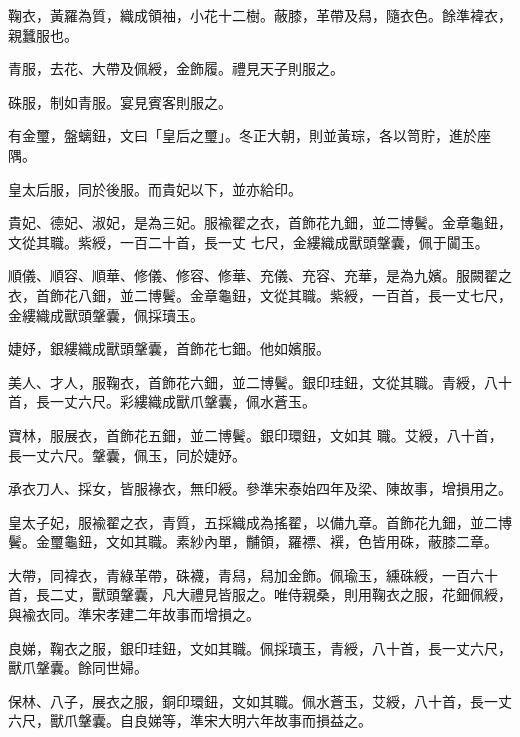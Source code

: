 \begin{pinyinscope}
 鞠衣，黃羅為質，織成領袖，小花十二樹。蔽膝，革帶及舄，隨衣色。餘準褘衣，親蠶服也。



 青服，去花、大帶及佩綬，金飾履。禮見天子則服之。



 硃服，制如青服。宴見賓客則服之。



 有金璽，盤螭鈕，文曰「皇后之璽」。冬正大朝，則並黃琮，各以笥貯，進於座隅。



 皇太后服，同於後服。而貴妃以下，並亦給印。



 貴妃、德妃、淑妃，是為三妃。服褕翟之衣，首飾花九鈿，並二博鬢。金章龜鈕，文從其職。紫綬，一百二十首，長一丈
 七尺，金縷織成獸頭鞶囊，佩于闐玉。



 順儀、順容、順華、修儀、修容、修華、充儀、充容、充華，是為九嬪。服闕翟之衣，首飾花八鈿，並二博鬢。金章龜鈕，文從其職。紫綬，一百首，長一丈七尺，金縷織成獸頭鞶囊，佩採瓄玉。



 婕妤，銀縷織成獸頭鞶囊，首飾花七鈿。他如嬪服。



 美人、才人，服鞠衣，首飾花六鈿，並二博鬢。銀印珪鈕，文從其職。青綬，八十首，長一丈六尺。彩縷織成獸爪鞶囊，佩水蒼玉。



 寶林，服展衣，首飾花五鈿，並二博鬢。銀印環鈕，文如其
 職。艾綬，八十首，長一丈六尺。鞶囊，佩玉，同於婕妤。



 承衣刀人、採女，皆服褖衣，無印綬。參準宋泰始四年及梁、陳故事，增損用之。



 皇太子妃，服褕翟之衣，青質，五採織成為搖翟，以備九章。首飾花九鈿，並二博鬢。金璽龜鈕，文如其職。素紗內單，黼領，羅褾、襈，色皆用硃，蔽膝二章。



 大帶，同褘衣，青綠革帶，硃襪，青舄，舄加金飾。佩瑜玉，纁硃綬，一百六十首，長二丈，獸頭鞶囊，凡大禮見皆服之。唯侍親桑，則用鞠衣之服，花鈿佩綬，與褕衣同。準宋孝建二年故事而增損之。



 良娣，鞠衣之服，銀印珪鈕，文如其職。佩採瓄玉，青綬，八十首，長一丈六尺，獸爪鞶囊。餘同世婦。



 保林、八子，展衣之服，銅印環鈕，文如其職。佩水蒼玉，艾綬，八十首，長一丈六尺，獸爪鞶囊。自良娣等，準宋大明六年故事而損益之。




\end{pinyinscope}
